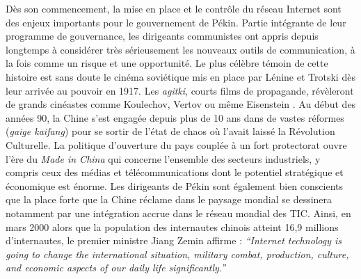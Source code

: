 Dès son commencement, la mise en place et le contrôle du réseau Internet sont des enjeux importants pour le gouvernement de Pékin. Partie intégrante de leur programme de gouvernance, les dirigeants communistes ont appris depuis longtemps à considérer très sérieusement les nouveaux outils de communication, à la fois comme un risque et une opportunité. Le plus célèbre témoin de cette histoire est sans doute le cinéma soviétique mis en place par Lénine et Trotski dès leur arrivée au pouvoir en 1917. Les \textit{agitki}, courts films de propagande, révèleront de grands cinéastes comme Koulechov, Vertov ou même Eisenstein \citep{Mazuy2002}. Au début des années 90, la Chine s’est engagée depuis plus de 10 ans dans de vastes réformes (\textit{gaige kaifang}) pour se sortir de l’état de chaos où l’avait laissé la Révolution Culturelle. La politique d’ouverture du pays couplée à un fort protectorat ouvre l’ère du \textit{Made in China} qui concerne l’ensemble des secteurs industriels, y compris ceux des médias et télécommunications dont le potentiel stratégique et économique est énorme. Les dirigeants de Pékin sont également bien conscients que la place forte que la Chine réclame dans le paysage mondial se dessinera notamment par une intégration accrue dans le réseau mondial des TIC. Ainsi, en mars 2000 alors que la population des internautes chinois atteint 16,9 millions d’internautes, le premier ministre Jiang Zemin affirme : \textit{“Internet technology is going to change the international situation, military combat, production, culture, and economic aspects of our daily life significantly.”} \citep{Foster2000}

